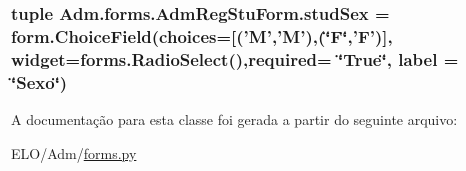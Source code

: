 \hypertarget{classAdm_1_1forms_1_1AdmRegStuForm_a3a4118b48fa8d77ceb006cd7da92cfd6}{
\subsubsection[{stud\-Sex}]{\setlength{\rightskip}{0pt plus 5cm}tuple Adm.\-forms.\-Adm\-Reg\-Stu\-Form.\-stud\-Sex = form.\-Choice\-Field(choices=\mbox{[}('M','M'),(\char`\"{}F\char`\"{},'F')\mbox{]}, widget=forms.\-Radio\-Select(),required= \char`\"{}True\char`\"{}, label = \char`\"{}Sexo\char`\"{})\hspace{0.3cm}{\ttfamily [static]}}}\label{classAdm_1_1forms_1_1AdmRegStuForm_a3a4118b48fa8d77ceb006cd7da92cfd6}


A documentação para esta classe foi gerada a partir do seguinte arquivo\-:\begin{DoxyCompactItemize}
\item 
E\-L\-O/\-Adm/\hyperlink{Adm_2forms_8py}{forms.\-py}\end{DoxyCompactItemize}
